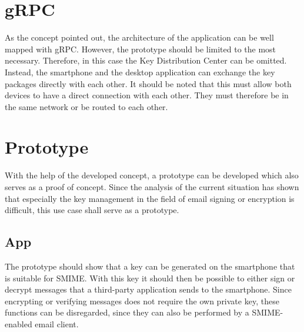 \documentclass[12pt,oneside,a4paper,parskip]{scrbook}
\begin{document}
\section{gRPC}
As the concept pointed out, the architecture of the application can be well mapped with gRPC. However, the prototype should be limited to the most necessary. Therefore, in this case the Key Distribution Center can be omitted. Instead, the smartphone and the desktop application can exchange the key packages directly with each other. It should be noted that this must allow both devices to have a direct connection with each other. They must therefore be in the same network or be routed to each other. 

\section{Prototype}
With the help of the developed concept, a prototype can be developed which also serves as a proof of concept. Since the analysis of the current situation has shown that especially the key management in the field of email signing or encryption is difficult, this use case shall serve as a prototype. 

\subsection{App}
The prototype should show that a key can be generated on the smartphone that is suitable for SMIME. With this key it should then be possible to either sign or decrypt messages that a third-party application sends to the smartphone. Since encrypting or verifying messages does not require the own private key, these functions can be disregarded, since they can also be performed by a SMIME-enabled email client. 
\end{document}
